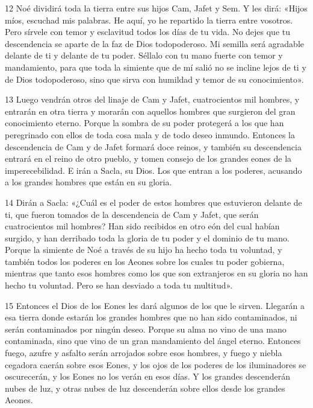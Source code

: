 \par 12 Noé dividirá toda la tierra entre sus hijos Cam, Jafet y Sem. Y les dirá: «Hijos míos, escuchad mis palabras. He aquí, yo he repartido la tierra entre vosotros. Pero sírvele con temor y esclavitud todos los días de tu vida. No dejes que tu descendencia se aparte de la faz de Dios todopoderoso. Mi semilla será agradable delante de ti y delante de tu poder. Séllalo con tu mano fuerte con temor y mandamiento, para que toda la simiente que de mí salió no se incline lejos de ti y de Dios todopoderoso, sino que sirva con humildad y temor de su conocimiento».

\par 13 Luego vendrán otros del linaje de Cam y Jafet, cuatrocientos mil hombres, y entrarán en otra tierra y morarán con aquellos hombres que surgieron del gran conocimiento eterno. Porque la sombra de su poder protegerá a los que han peregrinado con ellos de toda cosa mala y de todo deseo inmundo. Entonces la descendencia de Cam y de Jafet formará doce reinos, y también su descendencia entrará en el reino de otro pueblo, y tomen consejo de los grandes eones de la imperecebilidad. E irán a Sacla, su Dios. Los que entran a los poderes, acusando a los grandes hombres que están en su gloria.

\par 14 Dirán a Sacla: «¿Cuál es el poder de estos hombres que estuvieron delante de ti, que fueron tomados de la descendencia de Cam y Jafet, que serán cuatrocientos mil hombres? Han sido recibidos en otro eón del cual habían surgido, y han derribado toda la gloria de tu poder y el dominio de tu mano. Porque la simiente de Noé a través de su hijo ha hecho toda tu voluntad, y también todos los poderes en los Aeones sobre los cuales tu poder gobierna, mientras que tanto esos hombres como los que son extranjeros en su gloria no han hecho tu voluntad. Pero se han desviado a toda tu multitud».

\par 15 Entonces el Dios de los Eones les dará algunos de los que le sirven. Llegarán a esa tierra donde estarán los grandes hombres que no han sido contaminados, ni serán contaminados por ningún deseo. Porque su alma no vino de una mano contaminada, sino que vino de un gran mandamiento del ángel eterno. Entonces fuego, azufre y asfalto serán arrojados sobre esos hombres, y fuego y niebla cegadora caerán sobre esos Eones, y los ojos de los poderes de los iluminadores se oscurecerán, y los Eones no los verán en esos días. Y los grandes descenderán nubes de luz, y otras nubes de luz descenderán sobre ellos desde los grandes Aeones.

